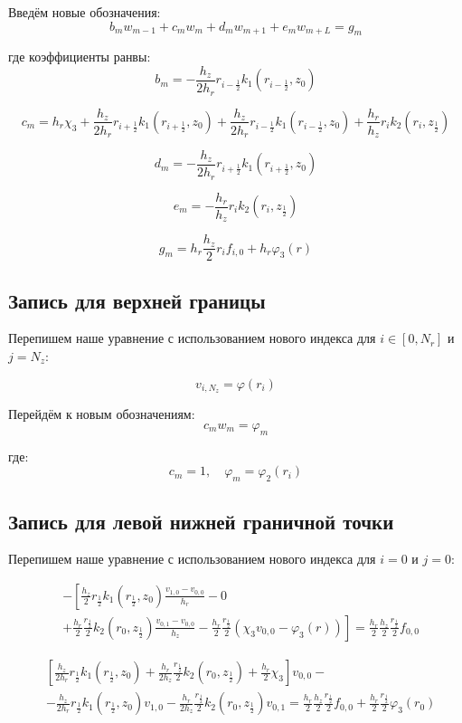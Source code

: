 Введём новые обозначения:
\[
  b_m w_{m - 1} + c_m w_m + d_m w_{m + 1} + e_m w_{m + L} = g_m
\]

где коэффициенты ранвы:
\[
  b_m = - \frac{h_z}{2 h_r} r_{i - \frac{1}{2}} k_1(r_{i - \frac{1}{2}}, z_0)
\]

\[
  c_m = h_r \chi_3 +\frac{h_z}{2 h_r} r_{i + \frac{1}{2}} k_1(r_{i + \frac{1}{2}}, z_0) + \frac{h_z}{2 h_r} r_{i - \frac{1}{2}} k_1(r_{i - \frac{1}{2}}, z_0)
  + \frac{h_r}{h_z} r_i k_2(r_i, z_{\frac{1}{2}}) 
\]

\[
  d_m = - \frac{h_z}{2 h_r} r_{i + \frac{1}{2}} k_1(r_{i + \frac{1}{2}}, z_0)
\]

\[
  e_m = - \frac{h_r}{h_z} r_i k_2 (r_i, z_{\frac{1}{2}})
\]

\[
  g_m = h_r \frac{h_z}{2} r_i f_{i, 0} + h_r \varphi_3(r)
\]

\subsection{Запись для верхней границы}
Перепишем наше уравнение с использованием нового индекса для $i \in [0, N_r] $ и $ j = N_z $:

\[
  v_{i, N_z} = \varphi(r_i)
\]

Перейдём к новым обозначениям:
\[
  c_m w_m = \varphi_m
\]

где:
\[
  c_m = 1, \quad \varphi_m = \varphi_2(r_i)
\]


\subsection{Запись для левой нижней граничной точки}

Перепишем наше уравнение с использованием нового индекса для $i = 0 $ и $ j = 0 $:

\begin{align*}
  &- \left [ 
  \frac{h_z}{2} r_{\frac{1}{2}} k_1(r_{\frac{1}{2}}, z_0) \frac{v_{1, 0} - v_{0, 0}}{h_{r}}
  - 0
  \right . \\
  &\left .
  + \frac{h_r}{2} \frac{r_{\frac{1}{2}}}{2} k_2(r_0, z_{\frac{1}{2}}) \frac{v_{0, 1} - v_{0, 0}}{h_{z}}
  - \frac{h_r}{2} \frac{r_{\frac{1}{2}}}{2} (\chi_3 v_{0, 0} - \varphi_3(r))
  \right ]  = \frac{h_r}{2} \frac{h_z}{2} \frac{r_{\frac{1}{2}}}{2} f_{0, 0}
\end{align*}

\begin{align*}
  &\left[
    \frac{h_z}{2 h_r} r_{\frac{1}{2}} k_1(r_{\frac{1}{2}}, z_0) + \frac{h_r}{2 h_z} \frac{r_{\frac{1}{2}}}{2} k_2(r_0, z_{\frac{1}{2}}) + \frac{h_r}{2} \chi_3
  \right] v_{0, 0} - \\
  & - \frac{h_z}{2 h_r} r_\frac{1}{2} k_1(r_\frac{1}{2}, z_0) v_{1,0} 
  - \frac{h_r}{2 h_z} \frac{r_{\frac{1}{2}}}{2} k_2(r_0, z_{\frac{1}{2}}) v_{0, 1}
  = \frac{h_r}{2} \frac{h_z}{2} \frac{r_{\frac{1}{2}}}{2} f_{0, 0} + \frac{h_r}{2} \frac{r_{\frac{1}{2}}}{2} \varphi_3(r_0)
\end{align*}

